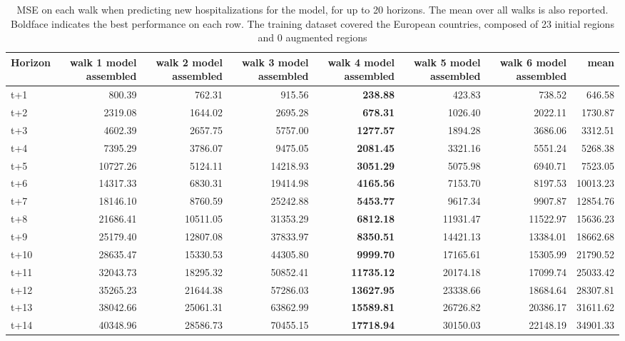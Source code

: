 \begin{table}[H]
\centering
\caption{MSE on each walk when predicting new hospitalizations for the model, for up to 20 horizons. The mean over all walks is also reported. Boldface indicates the best performance on each row. The training dataset covered the European countries, composed of 23 initial regions and 0 augmented regions }
\label{tab:MSE_walk_assembly}
\begin{tabular}{lrrrrrrr}
\toprule
Horizon &  walk 1 model assembled &  walk 2 model assembled &  walk 3 model assembled &  walk 4 model assembled &  walk 5 model assembled &  walk 6 model assembled &     mean \\
\midrule
t+1  & 800.39  & 762.31  & 915.56  & \textbf{238.88}  & 423.83  & 738.52  & 646.58  \\
t+2  & 2319.08  & 1644.02  & 2695.28  & \textbf{678.31}  & 1026.40  & 2022.11  & 1730.87  \\
t+3  & 4602.39  & 2657.75  & 5757.00  & \textbf{1277.57}  & 1894.28  & 3686.06  & 3312.51  \\
t+4  & 7395.29  & 3786.07  & 9475.05  & \textbf{2081.45}  & 3321.16  & 5551.24  & 5268.38  \\
t+5  & 10727.26  & 5124.11  & 14218.93  & \textbf{3051.29}  & 5075.98  & 6940.71  & 7523.05  \\
t+6  & 14317.33  & 6830.31  & 19414.98  & \textbf{4165.56}  & 7153.70  & 8197.53  & 10013.23  \\
t+7  & 18146.10  & 8760.59  & 25242.88  & \textbf{5453.77}  & 9617.34  & 9907.87  & 12854.76  \\
t+8  & 21686.41  & 10511.05  & 31353.29  & \textbf{6812.18}  & 11931.47  & 11522.97  & 15636.23  \\
t+9  & 25179.40  & 12807.08  & 37833.97  & \textbf{8350.51}  & 14421.13  & 13384.01  & 18662.68  \\
t+10  & 28635.47  & 15330.53  & 44305.80  & \textbf{9999.70}  & 17165.61  & 15305.99  & 21790.52  \\
t+11  & 32043.73  & 18295.32  & 50852.41  & \textbf{11735.12}  & 20174.18  & 17099.74  & 25033.42  \\
t+12  & 35265.23  & 21644.38  & 57286.03  & \textbf{13627.95}  & 23338.66  & 18684.64  & 28307.81  \\
t+13  & 38042.66  & 25061.31  & 63862.99  & \textbf{15589.81}  & 26726.82  & 20386.17  & 31611.62  \\
t+14  & 40348.96  & 28586.73  & 70455.15  & \textbf{17718.94}  & 30150.03  & 22148.19  & 34901.33  \\

\end{tabular}
\end{table}

